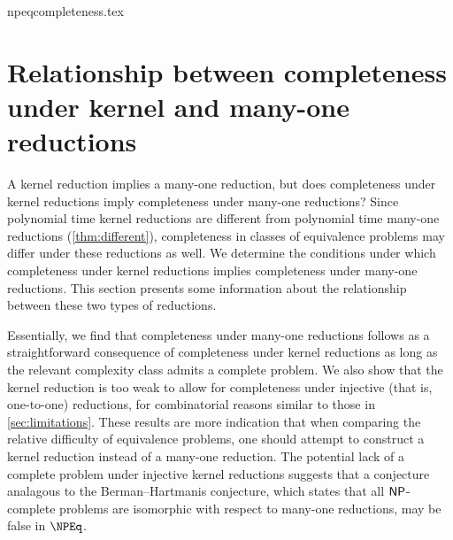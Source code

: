 \begin{filecontents}{npeqcompleteness.tex}
\section
    [Relationship between completeness under kernel and many-one reductions]
    {Relationship between completeness \\ under kernel and many-one reductions}
\label{sec:npeqcompleteness}
%
A kernel reduction implies a many-one reduction, but does completeness under kernel reductions imply completeness under many-one reductions?
Since polynomial time kernel reductions are different from polynomial time many-one reductions (\ref{thm:different}), completeness in classes of equivalence problems may differ under these reductions as well.
We determine the conditions under which completeness under kernel reductions implies completeness under many-one reductions.
This section presents some information about the relationship between these two types of reductions.

%
Essentially, we find that completeness under many-one reductions follows as a straightforward consequence of completeness under kernel reductions as long as the relevant complexity class admits a complete problem.
We also show that the kernel reduction is too weak to allow for completeness under injective (that is, one-to-one) reductions, for combinatorial reasons similar to those in \ref{sec:limitations}.
These results are more indication that when comparing the relative difficulty of equivalence problems, one should attempt to construct a kernel reduction instead of a many-one reduction.
The potential lack of a complete problem under injective kernel reductions suggests that a conjecture analagous to the Berman--Hartmanis conjecture, which states that all $\NP$-complete problems are isomorphic with respect to many-one reductions, may be false in $\NPEq$.


\end{filecontents}
